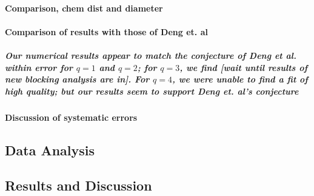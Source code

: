 \documentclass[pre,preprint]{revtex4-1}
\begin{document}
\paragraph{Comparison, chem dist and diameter}
\label{sec-1.4.1}
\paragraph{Comparison of results with those of Deng et. al}
\label{sec-1.4.2}
\subparagraph{Our numerical results appear to match the conjecture of Deng et al. \cite{Deng2010} within error for $q=1$ and $q=2$; for $q=3$, we find [wait until results of new blocking analysis are in].  For $q=4$, we were unable to find a fit of high quality; but our results seem to support Deng et. al's conjecture}
\label{sec-1.4.2.1}
\paragraph{Discussion of systematic errors}
\label{sec-1.4.3}





\subsection{Data Analysis}
\label{sec-1.3}
\subsection{Results and Discussion}
\label{sec-1.4}
\end{document}
